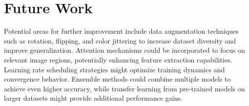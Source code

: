 \documentclass{article}
\begin{document}
\section{Future Work}

Potential areas for further improvement include data augmentation techniques such as rotation, flipping, and color jittering to increase dataset diversity and improve generalization. Attention mechanisms could be incorporated to focus on relevant image regions, potentially enhancing feature extraction capabilities. Learning rate scheduling strategies might optimize training dynamics and convergence behavior. Ensemble methods could combine multiple models to achieve even higher accuracy, while transfer learning from pre-trained models on larger datasets might provide additional performance gains.
\end{document}
